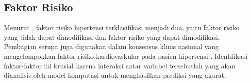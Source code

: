     


\subsection{Faktor Risiko}
Menurut \textcite{black2014keperawatan}, faktor risiko hipertensi terklasifikasi menjadi dua, yaitu faktor risiko yang tidak dapat dimodifikasi dan faktor risiko yang dapat dimodifikasi. Pembagian serupa juga digunakan dalam konsensus klinis nasional yang mengelompokkan faktor risiko kardiovaskular pada pasien hipertensi \autocite{PERHI2021}. Identifikasi faktor-faktor ini krusial karena interaksi antar variabel tersebutlah yang akan dianalisis oleh model komputasi untuk menghasilkan prediksi yang akurat.


